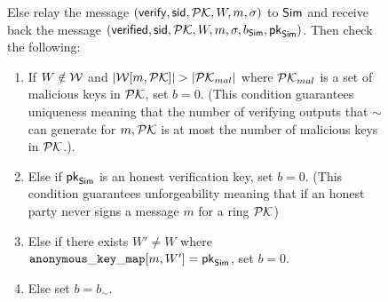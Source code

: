 \begin{figure}
\begin{tcolorbox}
{\begin{description}
\begin{list}{\hspace*{1pt} C}{}
				\item \label{cond:malicioussignature}Else relay the message $(\mathsf{verify}, \textsf{sid}, {\mathcal{PK}},W, m, \sigma)$ to $ \mathsf{Sim} $ and receive back the message $(\mathsf{verified}, \textsf{sid}, {\mathcal{PK}},W, m, \sigma, b_{\mathsf{Sim}}, \mathsf{pk}_{\mathsf{Sim}})$.  Then check the following:

				\begin{enumerate}
					\item If $ W \notin \mathcal{W} $ and $ |\mathcal{W}[m, {\mathcal{PK}}]| > |{\mathcal{PK}}_{mal}| $ where $ {\mathcal{PK}}_{mal} $ is a set of malicious keys in $ {\mathcal{PK}} $, set $ b = 0 $.
					(This condition guarantees  uniqueness meaning that the number of verifying outputs that $ \sim $ can generate for $ m, {\mathcal{PK}} $ is at most the  number of malicious keys in $ {\mathcal{PK}} $.)\label{cond:uniqueness}.
					
					\item Else if $ \mathsf{pk}_{\mathsf{Sim}} $ is an honest verification key, set $ b = 0 $. (This condition guarantees unforgeability meaning that if an honest party never signs a message $ m $ for a ring $ {\mathcal{PK}} $)\label{cond:forgery}
					
					\item Else if there exists $ W' \neq W $ where  $ \mathtt{anonymous\_key\_map}[m,W'] = \mathsf{pk}_{\mathsf{Sim}} $, set $ b = 0 $. \label{cond:differentWforsamepk}
					\item Else set $ b = b_\sim$. \label{cond:simulatorbit}
				\end{enumerate}		
				

\end{list}
\end{description}}
\end{tcolorbox}
\end{figure}

